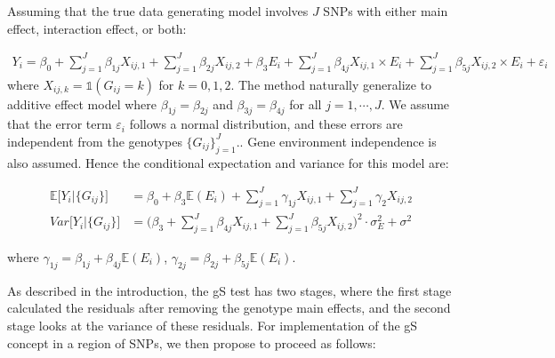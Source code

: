 \documentclass{article}
\begin{document}

Assuming that the true data generating model involves $J$ SNPs with either main effect, interaction effect, or both:

\begin{equation}
\begin{split}
Y_i =\beta_0+\sum_{j=1}^J\beta_{1j}X_{ij,1}+\sum_{j=1}^J\beta_{2j}X_{ij,2}+\beta_3 E_i
+\sum_{j=1}^J\beta_{4j}X_{ij,1}\times E_i
+\sum_{j=1}^J\beta_{5j}X_{ij,2}\times E_i+\varepsilon_i
\end{split}
\label{eq:truemv}
\end{equation}
where $X_{ij,k}=\mathds{1}(G_{ij}=k)$ for $k=0,1,2$. The method naturally generalize to additive effect model where $\beta_{1j}=\beta_{2j}$ and $\beta_{3j}=\beta_{4j}$ for all $j=1,\cdots, J$.  We assume that the error term $\varepsilon_i$ follows a normal distribution, and these errors are independent from the genotypes $\{ G_{ij}\}_{j=1}^J$.. Gene environment independence is also assumed. Hence the conditional expectation and variance for this model are:

\begin{equation}
\begin{split}\mathbb{E}\big[Y_i|\{G_{ij}\}\big] & =\beta_0+\beta_3\mathbb{E}(E_i)+\sum_{j=1}^J\gamma_{1j}X_{ij,1}+\sum_{j=1}^J\gamma_2 X_{ij,2}\\
    Var\big[Y_i|\{G_{ij}\}\big] &=\bigg(\beta_3+\sum_{j=1}^J\beta_{4j}X_{ij,1}+\sum_{j=1}^J\beta_{5j}X_{ij,2}\bigg)^2\cdot \sigma_E^2+\sigma^2
    \end{split}
\end{equation}

where $\gamma_{1j}=\beta_{1j}+\beta_{4j}\mathbb{E}(E_i)$, $\gamma_{2j}=\beta_{2j}+\beta_{5j}\mathbb{E}(E_i)$.

As described in the introduction, the gS test has two stages, where the first stage calculated the residuals after removing the genotype main effects, and the second stage looks at the variance of these residuals. For implementation of the gS concept in a region of SNPs, we then propose to proceed as follows:
\end{document}
